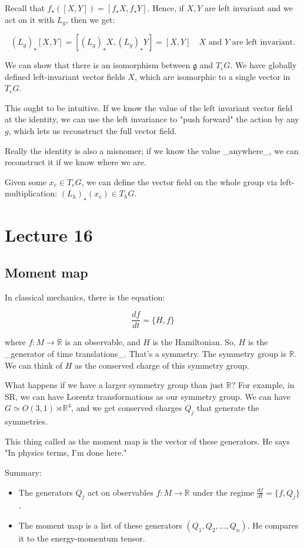 \documentclass[11pt]{book}
\begin{document}
Recall that $f_\star([X, Y]) = [f_\star X, f_\star Y]$. Hence, if $X, Y$
are left invariant and we act on it with $L_g$, then we get:

$$
(L_g)_\star [X, Y] = [(L_g)_\star X, (L_g)_\star Y] = [X, Y] \quad \text{$X$ and $Y$ are left invariant.}
$$

We can show that there is an isomorphism between $\mathfrak g$ and $T_e G$. 
We have globally defined left-invariant vector fields $X$, which are isomorphic
to a single vector in $T_e G$.

This ought to be intuitive. If we know the value of the left invariant vector
field at the identity, we can use the left invariance to "push forward" the
action by any $g$, which lets us reconstruct the full vector field. 


Really the identity is also a misnomer; if we know the value _anywhere_,
we can reconstruct it if we know where we are.

Given some $x_e \in T_e G$, we can define the vector field on the whole group
via left-multiplication: $(L_h)_\star(x_e) \in T_h G$.


\chapter{Lecture 16}
\section{Moment map}

In classical mechanics, there is the equation:

$$
\frac{df}{dt} = \{ H, f \}
$$

where $f: M \rightarrow \mathbb R$ is an observable, and $H$ is the Hamiltonian.
So, $H$ is the _generator of time translations_. That's a symmetry. The
symmetry group is $\mathbb R$. We can think of $H$ as the conserved charge
of this symmetry group.


What happens if we have a larger symmetry group than just $\mathbb R$? For example,
in SR, we can have Lorentz transformations as our symmetry group. We can
have $G \simeq O(3, 1) \rtimes \mathbb R^4$, and we get conserved charges 
$Q_j$ that generate the symmetries.

This thing called as the moment map is the vector of these generators. He says
"In physics terms, I'm done here."

Summary:
\begin{itemize}
\item The generators $Q_j$ act on observables $f: M \rightarrow \mathbb R$ under
  the regime $\frac{df}{dt} = \{f, Q_j\}$.
\item The moment map is a list of these generators $(Q_1, Q_2, \dots, Q_n)$.
     He compares it to the energy-momentum tensor.
\end{itemize}
\end{document}
